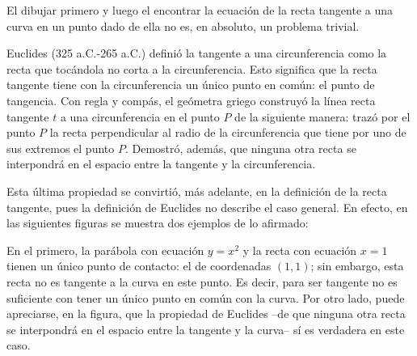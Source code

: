 El dibujar primero y luego el encontrar la ecuación de la recta tangente a una curva en un punto
dado de ella no es, en absoluto, un problema trivial.

Euclides (325 a.C.-265 a.C.) definió la tangente a una circunferencia como la recta que tocándola
no corta a la circunferencia.
Esto significa que la recta tangente tiene con la circunferencia un único punto en común: el punto
de tangencia. Con regla y compás, el geómetra griego construyó la línea recta tangente $t$ a una
circunferencia en el punto $P$ de la siguiente manera: trazó por el punto $P$ la recta
perpendicular al radio de la circunferencia que tiene por uno de sus extremos el punto $P$.
Demostró, además, que ninguna otra recta se interpondrá en el espacio entre la tangente y la
circunferencia.

Esta última propiedad se convirtió, más adelante, en la definición de la recta tangente, pues la
definición de Euclides no describe el caso general. En efecto, en las siguientes figuras se muestra
dos ejemplos de lo afirmado:

\begin{figure}[h]
%
\begin{center}
%
\hspace{.175\textwidth}
%
\end{center}
\end{figure}
En el primero, la parábola con ecuación $y = x^2$ y la recta con ecuación $x = 1$ tienen un único
punto de contacto: el de coordenadas $(1,1)$; sin embargo, esta recta no es tangente a la curva en
este punto. Es decir, para ser tangente no es suficiente con tener un único punto en común con la
curva. Por otro lado, puede apreciarse, en la figura, que la propiedad de Euclides --de que ninguna
otra recta se interpondrá en el espacio entre la tangente y la curva-- sí es verdadera en este
caso.

